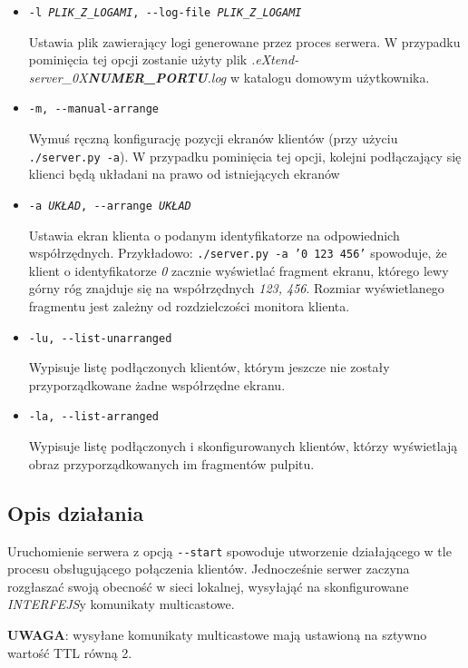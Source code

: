 \begin{itemize}
    \item \texttt{-l \emph{PLIK\_Z\_LOGAMI}, -{}-log-file \emph{PLIK\_Z\_LOGAMI}}

      Ustawia plik zawierający logi generowane przez proces serwera. W przypadku pominięcia tej opcji zostanie użyty plik \emph{.eXtend-server\_0X\textbf{NUMER\_PORTU}.log} w katalogu domowym użytkownika.

    \item \texttt{-m, -{}-manual-arrange}

      Wymuś ręczną konfigurację pozycji ekranów klientów (przy użyciu \texttt{./server.py -a}). W przypadku pominięcia tej opcji, kolejni podłączający się klienci będą układani na prawo od istniejących ekranów

    \item \texttt{-a \emph{UKŁAD}, -{}-arrange \emph{UKŁAD}}

      Ustawia ekran klienta o podanym identyfikatorze na odpowiednich współrzędnych. Przykładowo: \texttt{./server.py -a '0 123 456'} spowoduje, że klient o identyfikatorze \emph{0} zacznie wyświetlać fragment ekranu, którego lewy górny róg znajduje się na współrzędnych \emph{123, 456}. Rozmiar wyświetlanego fragmentu jest zależny od rozdzielczości monitora klienta.

    \item \texttt{-lu, -{}-list-unarranged}

      Wypisuje listę podłączonych klientów, którym jeszcze nie zostały przyporządkowane żadne współrzędne ekranu.

    \item \texttt{-la, -{}-list-arranged}

      Wypisuje listę podłączonych i skonfigurowanych klientów, którzy wyświetlają obraz przyporządkowanych im fragmentów pulpitu.

  \end{itemize}

  \subsection{Opis działania}
    Uruchomienie serwera z opcją \texttt{-{}-start} spowoduje utworzenie działającego w tle procesu obsługującego połączenia klientów. Jednocześnie serwer zaczyna rozgłaszać swoją obecność w sieci lokalnej, wysyłająć na skonfigurowane \emph{INTERFEJS}y komunikaty multicastowe.

    \textbf{UWAGA}: wysyłane komunikaty multicastowe mają ustawioną na sztywno wartość TTL równą 2.

